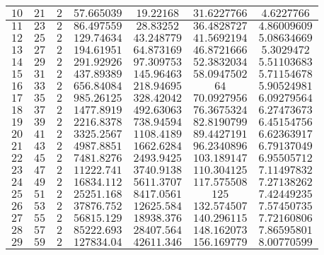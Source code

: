 \documentclass[10pt,a4paper]{article}
\begin{document}
\begin{enumerate}[1.]
\begin{center}
\begin{longtable}{|c|c|c|c|c|c|c|}
        $10$ & $21$ & $2$ & $57.665039$ & $19.22168$ & $31.6227766$ & $4.6227766$\\ \hline
        $11$ & $23$ & $2$ & $86.497559$ & $28.83252$ & $36.4828727$ & $4.86009609$\\ \hline
        $12$ & $25$ & $2$ & $129.74634$ & $43.248779$ & $41.5692194$ & $5.08634669$\\ \hline
        $13$ & $27$ & $2$ & $194.61951$ & $64.873169$ & $46.8721666$ & $5.3029472$\\ \hline
        $14$ & $29$ & $2$ & $291.92926$ & $97.309753$ & $52.3832034$ & $5.51103683$\\ \hline
        $15$ & $31$ & $2$ & $437.89389$ & $145.96463$ & $58.0947502$ & $5.71154678$\\ \hline
        $16$ & $33$ & $2$ & $656.84084$ & $218.94695$ & $64$ & $5.90524981$\\ \hline
        $17$ & $35$ & $2$ & $985.26125$ & $328.42042$ & $70.0927956$ & $6.09279564$\\ \hline
        $18$ & $37$ & $2$ & $1477.8919$ & $492.63063$ & $76.3675324$ & $6.27473673$\\ \hline
        $19$ & $39$ & $2$ & $2216.8378$ & $738.94594$ & $82.8190799$ & $6.45154756$\\ \hline
        $20$ & $41$ & $2$ & $3325.2567$ & $1108.4189$ & $89.4427191$ & $6.62363917$\\ \hline
        $21$ & $43$ & $2$ & $4987.8851$ & $1662.6284$ & $96.2340896$ & $6.79137049$\\ \hline
        $22$ & $45$ & $2$ & $7481.8276$ & $2493.9425$ & $103.189147$ & $6.95505712$\\ \hline
        $23$ & $47$ & $2$ & $11222.741$ & $3740.9138$ & $110.304125$ & $7.11497832$\\ \hline
        $24$ & $49$ & $2$ & $16834.112$ & $5611.3707$ & $117.575508$ & $7.27138262$\\ \hline
        $25$ & $51$ & $2$ & $25251.168$ & $8417.0561$ & $125$ & $7.42449235$\\ \hline
        $26$ & $53$ & $2$ & $37876.752$ & $12625.584$ & $132.574507$ & $7.57450735$\\ \hline
        $27$ & $55$ & $2$ & $56815.129$ & $18938.376$ & $140.296115$ & $7.72160806$\\ \hline
        $28$ & $57$ & $2$ & $85222.693$ & $28407.564$ & $148.162073$ & $7.86595801$\\ \hline
        $29$ & $59$ & $2$ & $127834.04$ & $42611.346$ & $156.169779$ & $8.00770599$\\ \hline

\end{longtable}
\end{center}
\end{enumerate}
\end{document}
